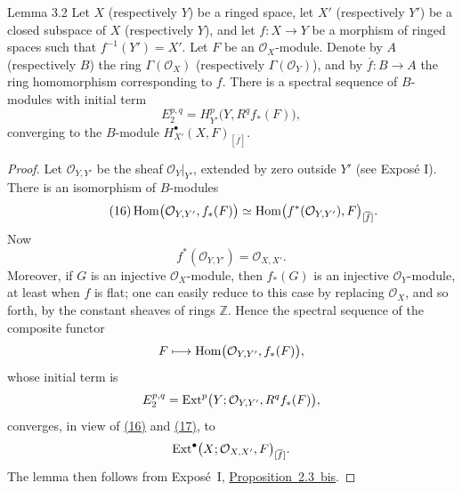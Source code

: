 \begin{sgalemma}{Lemma 3.2}
Let $X$ (respectively $Y$) be a ringed space, let $X'$ (respectively $Y'$)
be a closed subspace of $X$ (respectively $Y$), and let
$f\colon X\to Y$ be a morphism of ringed spaces such that
$f^{-1}(Y')=X'$. Let $F$ be an $\mathcal O_X$-module. Denote by $A$
(respectively $B$) the ring $\Gamma(\mathcal O_X)$ (respectively
$\Gamma(\mathcal O_Y)$), and by $\overline f\colon B\to A$ the ring
homomorphism corresponding to $f$. There is a spectral sequence of
$B$-modules with initial term
\begin{equation}\tag{15}\label{eq:V.15}
  E_2^{p,q}=H_{Y'}^p\bigl(Y,R^q f_*(F)\bigr),
\end{equation}
converging to the $B$-module
$H_{X'}^{\bullet}(X,F)_{[\overline f]}$.
\end{sgalemma}

\begin{proof}
Let $\mathcal O_{Y,Y'}$ be the sheaf
$\mathcal O_Y\vert_{Y'}$, extended by zero outside $Y'$ (see Expos\'e I).
There is an isomorphism of $B$-modules
\begin{equation}\tag{16}\label{eq:V.16}
  \operatorname{Hom}\bigl(\mathcal O_{Y,Y'},f_*(F)\bigr)
  \simeq
  \operatorname{Hom}\bigl(f^*(\mathcal O_{Y,Y'}),F\bigr)_{[\overline f]}.
\end{equation}
Now
\begin{equation}\tag{17}\label{eq:V.17}
  f^*(\mathcal O_{Y,Y'})=\mathcal O_{X,X'}.
\end{equation}
Moreover, if $G$ is an injective $\mathcal O_X$-module, then $f_*(G)$ is an
injective $\mathcal O_Y$-module, at least when $f$ is flat; one can easily
reduce to this case by replacing $\mathcal O_X$, and so forth, by the constant
sheaves of rings $\mathbb Z$. Hence the spectral sequence of the composite
functor
\[
  F\longmapsto\operatorname{Hom}\bigl(\mathcal O_{Y,Y'},f_*(F)\bigr),
\]
whose initial term is
\[
  E_2^{p,q}=\operatorname{Ext}^p\bigl(Y;\mathcal O_{Y,Y'},R^q f_*(F)\bigr),
\]
converges, in view of \textup{\hyperref[eq:V.16]{(16)}} and \textup{\hyperref[eq:V.17]{(17)}}, to
\[
  \operatorname{Ext}^{\bullet}\bigl(X;\mathcal O_{X,X'},F\bigr)_{[\overline f]}.
\]
The lemma then follows from Expos\'e~I,
\hyperref[I.2.3bof]{Proposition~2.3~bis}.
\end{proof}

